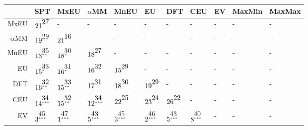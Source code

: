 \begin{table}[!htb]
\centering
\begin{tabular}{rllllllllll}
  \hline
 & SPT & MxEU & $\alpha$MM & MnEU & EU & DFT & CEU & EV & MaxMin & MaxMax \\ 
  \hline
MxEU & $21^{\stackrel{\textstyle27\hfill}{\scriptscriptstyle\hfill}}$ & - & - & - & - & - & - & - & - & - \\ 
  $\alpha$MM & $19^{\stackrel{\textstyle29\hfill}{\scriptscriptstyle\hfill}}$ & $21^{\stackrel{\textstyle16\hfill}{\scriptscriptstyle\hfill}}$ & - & - & - & - & - & - & - & - \\ 
  MnEU & $13^{\stackrel{\textstyle35\hfill}{\scriptscriptstyle**\hfill}}$ & $18^{\stackrel{\textstyle30\hfill}{\scriptscriptstyle*\hfill}}$ & $18^{\stackrel{\textstyle27\hfill}{\scriptscriptstyle\hfill}}$ & - & - & - & - & - & - & - \\ 
  EU & $15^{\stackrel{\textstyle33\hfill}{\scriptscriptstyle*\hfill}}$ & $16^{\stackrel{\textstyle31\hfill}{\scriptscriptstyle*\hfill}}$ & $16^{\stackrel{\textstyle32\hfill}{\scriptscriptstyle\hfill}}$ & $15^{\stackrel{\textstyle29\hfill}{\scriptscriptstyle\hfill}}$ & - & - & - & - & - & - \\ 
  DFT & $16^{\stackrel{\textstyle32\hfill}{\scriptscriptstyle**\hfill}}$ & $15^{\stackrel{\textstyle33\hfill}{\scriptscriptstyle**\hfill}}$ & $17^{\stackrel{\textstyle31\hfill}{\scriptscriptstyle\hfill}}$ & $18^{\stackrel{\textstyle30\hfill}{\scriptscriptstyle\hfill}}$ & $19^{\stackrel{\textstyle29\hfill}{\scriptscriptstyle\hfill}}$ & - & - & - & - & - \\ 
  CEU & $14^{\stackrel{\textstyle34\hfill}{\scriptscriptstyle***\hfill}}$ & $15^{\stackrel{\textstyle32\hfill}{\scriptscriptstyle**\hfill}}$ & $12^{\stackrel{\textstyle34\hfill}{\scriptscriptstyle***\hfill}}$ & $22^{\stackrel{\textstyle25\hfill}{\scriptscriptstyle\hfill}}$ & $23^{\stackrel{\textstyle24\hfill}{\scriptscriptstyle\hfill}}$ & $26^{\stackrel{\textstyle22\hfill}{\scriptscriptstyle\hfill}}$ & - & - & - & - \\ 
  EV & $3^{\stackrel{\textstyle45\hfill}{\scriptscriptstyle***\hfill}}$ & $1^{\stackrel{\textstyle47\hfill}{\scriptscriptstyle***\hfill}}$ & $5^{\stackrel{\textstyle43\hfill}{\scriptscriptstyle***\hfill}}$ & $3^{\stackrel{\textstyle45\hfill}{\scriptscriptstyle***\hfill}}$ & $2^{\stackrel{\textstyle46\hfill}{\scriptscriptstyle***\hfill}}$ & $5^{\stackrel{\textstyle43\hfill}{\scriptscriptstyle***\hfill}}$ & $8^{\stackrel{\textstyle40\hfill}{\scriptscriptstyle***\hfill}}$ & - & - & - \\ 

\end{tabular}
\end{table}
